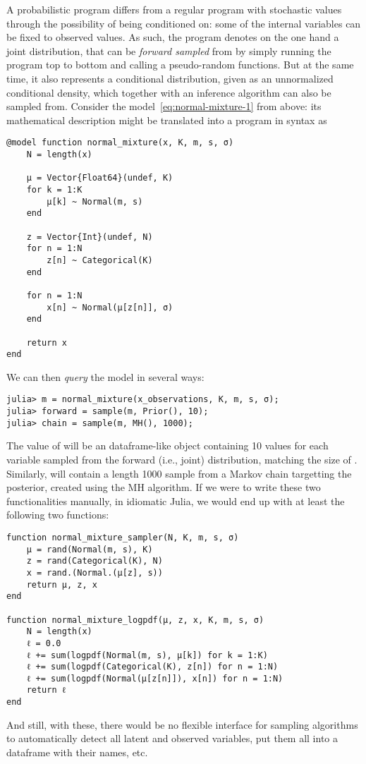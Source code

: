 A probabilistic program differs from a regular program with stochastic values through the
possibility of being conditioned on: some of the internal variables can be fixed to observed
values. As such, the program denotes on the one hand a joint distribution, that can be \emph{forward
  sampled} from by simply running the program top to bottom and calling a pseudo-random functions.
But at the same time, it also represents a conditional distribution, given as an unnormalized
conditional density, which together with an inference algorithm can also be sampled from.  Consider
the model~\eqref{eq:normal-mixture-1} from above: its mathematical description might be translated
into a program in \turingjl{} syntax as
\begin{lstlisting}
@model function normal_mixture(x, K, m, s, σ)
    N = length(x)

    μ = Vector{Float64}(undef, K)
    for k = 1:K
        μ[k] ~ Normal(m, s)
    end

    z = Vector{Int}(undef, N)
    for n = 1:N
        z[n] ~ Categorical(K)
    end

    for n = 1:N
        x[n] ~ Normal(μ[z[n]], σ)
    end

    return x
end
\end{lstlisting}
We can then \emph{query} the model in several ways:
\begin{lstlisting}
julia> m = normal_mixture(x_observations, K, m, s, σ);
julia> forward = sample(m, Prior(), 10);
julia> chain = sample(m, MH(), 1000);
\end{lstlisting}
The value of  will be an dataframe-like object containing 10 values for each variable
sampled from the forward (i.e., joint) distribution, matching the size of .
Similarly,  will contain a length 1000 sample from a Markov chain targetting the
posterior, created using the MH algorithm.  If we were to write these two functionalities manually,
in idiomatic Julia, we would end up with at least the following two functions:
\begin{lstlisting}
function normal_mixture_sampler(N, K, m, s, σ)
    μ = rand(Normal(m, s), K)
    z = rand(Categorical(K), N)
    x = rand.(Normal.(μ[z], s))
    return μ, z, x
end

function normal_mixture_logpdf(μ, z, x, K, m, s, σ)
    N = length(x)
    ℓ = 0.0
    ℓ += sum(logpdf(Normal(m, s), μ[k]) for k = 1:K)
    ℓ += sum(logpdf(Categorical(K), z[n]) for n = 1:N)
    ℓ += sum(logpdf(Normal(μ[z[n]]), x[n]) for n = 1:N)
    return ℓ
end
\end{lstlisting}
And still, with these, there would be no flexible interface for sampling algorithms to automatically
detect all latent and observed variables, put them all into a dataframe with their names, etc.

